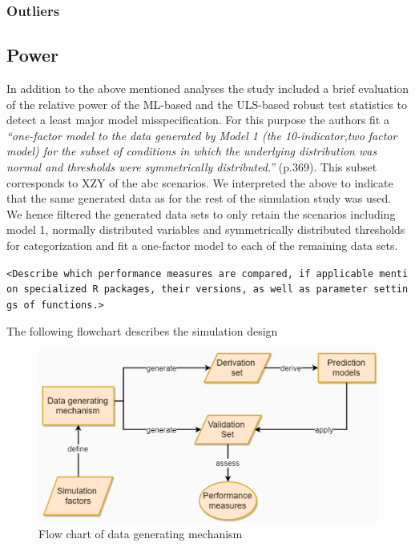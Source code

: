 \documentclass[10,a4paperpaper,]{article}
\begin{document}
\subsubsection{Outliers}
\subsection{Power}

In addition to the above mentioned analyses the study included a brief
evaluation of the relative power of the ML-based and the ULS-based
robust test statistics to detect a least major model misspecification.
For this purpose the authors fit a \emph{``one-factor model to the data
generated by Model 1 (the 10-indicator,two factor model) for the subset
of conditions in which the underlying distribution was normal and
thresholds were symmetrically distributed.''} (p.369). This subset
corresponds to XZY of the abc scenarios. We interpreted the above to
indicate that the same generated data as for the rest of the simulation
study was used. We hence filtered the generated data sets to only retain
the scenarios including model 1, normally distributed variables and
symmetrically distributed thresholds for categorization and fit a
one-factor model to each of the remaining data sets.

\texttt{\textless{}Describe\ which\ performance\ measures\ are\ compared,\ if\ applicable\ mention\ specialized\ R\ packages,\ their\ versions,\ as\ well\ as\ parameter\ settings\ of\ functions.\textgreater{}}

The following flowchart describes the simulation design

\begin{figure}
\includegraphics[width=450pt]{flowchart} \caption{Flow chart of data generating mechanism}\label{fig:unnamed-chunk-1}
\end{figure}
\end{document}
